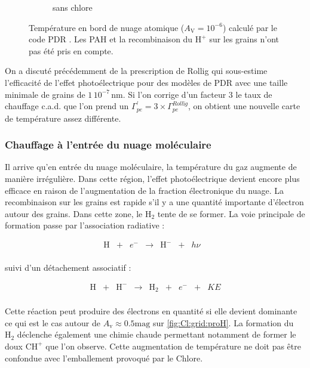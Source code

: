 \begin{figure}[!htbp]
\begin{subfigure}[t]{0.45\textwidth}
        \caption{sans chlore}
    \end{subfigure}
    \caption{Température en bord de nuage atomique ($A_\mathrm{V}= 10^{-6}$) calculé par le code PDR \uncinq. Les PAH et la recombinaison du $\mathrm{H}^+ $ sur les grains n'ont pas été pris en compte.}
    \label{fig:Cl:grid:mapT}
\end{figure}

On a discuté précédemment de la prescription de Rollig qui sous-estime l'efficacité de l'effet photoélectrique pour des modèles de PDR avec une taille minimale de grains de $1\,10^{-7} \, \mathrm{nm}$. Si l'on corrige d'un facteur 3 le taux de chauffage c.a.d. que l'on prend un $\Gamma_{pe}^{'} = 3 \times \Gamma_{pe}^{Rollïg}$, on obtient une nouvelle carte de température assez différente.


\subsubsection{Chauffage à l'entrée du nuage moléculaire}

Il arrive qu'en entrée du nuage moléculaire, la température du gaz augmente de manière irrégulière. Dans cette région, l'effet photoélectrique devient encore plus efficace en raison de l'augmentation de la fraction électronique du nuage. La recombinaison sur les grains est rapide s'il y a une quantité importante d'électron autour des grains. Dans cette zone, le $\mathrm{H}_2$ tente de se former. La voie principale de formation passe par l'association radiative :

\begin{equation}
    \begin{array}{lccccclr}
       \mathrm{H}  & + & e^- & \rightarrow & \mathrm{H}^{-} & + & h\nu &  \\
    \end{array}
\end{equation}

suivi d'un détachement associatif :

\begin{equation}
    \begin{array}{lcccccclr}
       \mathrm{H}  & + &  \mathrm{H}^- & \rightarrow & \mathrm{H}_2 & + & e^- & + & KE\\
    \end{array}
\end{equation}

Cette réaction peut produire des électrons en quantité si elle devient dominante ce qui est le cas autour de $A_\mathrm{v} \approx 0.5 \mathrm{mag}$ sur \autoref{fig:Cl:grid:proH}. La formation du $\mathrm{H}_2$ déclenche également une chimie chaude permettant notamment de former le doux $\mathrm{CH}^+$ que l'on observe. Cette augmentation de température ne doit pas être confondue avec l'emballement provoqué par le Chlore.


